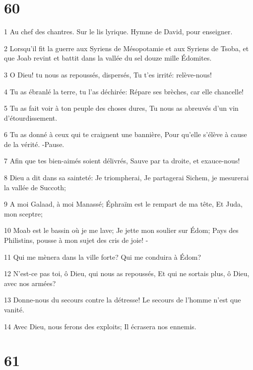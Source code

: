 \chapter{60}

\par 1 Au chef des chantres. Sur le lis lyrique. Hymne de David, pour enseigner.
\par 2 Lorsqu'il fit la guerre aux Syriens de Mésopotamie et aux Syriens de Tsoba, et que Joab revint et battit dans la vallée du sel douze mille Édomites.
\par 3 O Dieu! tu nous as repoussés, dispersés, Tu t'es irrité: relève-nous!
\par 4 Tu as ébranlé la terre, tu l'as déchirée: Répare ses brèches, car elle chancelle!
\par 5 Tu as fait voir à ton peuple des choses dures, Tu nous as abreuvés d'un vin d'étourdissement.
\par 6 Tu as donné à ceux qui te craignent une bannière, Pour qu'elle s'élève à cause de la vérité. -Pause.
\par 7 Afin que tes bien-aimés soient délivrés, Sauve par ta droite, et exauce-nous!
\par 8 Dieu a dit dans sa sainteté: Je triompherai, Je partagerai Sichem, je mesurerai la vallée de Succoth;
\par 9 A moi Galaad, à moi Manassé; Éphraïm est le rempart de ma tête, Et Juda, mon sceptre;
\par 10 Moab est le bassin où je me lave; Je jette mon soulier sur Édom; Pays des Philistins, pousse à mon sujet des cris de joie! -
\par 11 Qui me mènera dans la ville forte? Qui me conduira à Édom?
\par 12 N'est-ce pas toi, ô Dieu, qui nous as repoussés, Et qui ne sortais plus, ô Dieu, avec nos armées?
\par 13 Donne-nous du secours contre la détresse! Le secours de l'homme n'est que vanité.
\par 14 Avec Dieu, nous ferons des exploits; Il écrasera nos ennemis.

\chapter{61}

